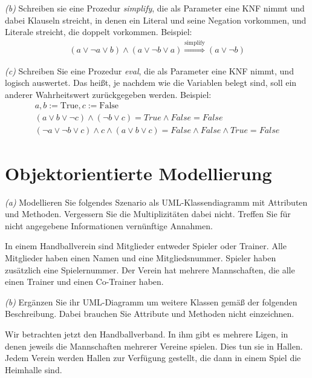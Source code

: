 \documentclass[11pt,a4paper,oneside,ngerman]{scrbook}
\begin{document}
\emph{(b)} Schreiben sie eine Prozedur \emph{simplify}, die als Parameter eine KNF nimmt und dabei Klauseln streicht, in denen ein Literal und seine Negation vorkommen, und Literale streicht, die doppelt vorkommen. Beispiel:
\begin{gather*}
  (a \lor \neg a \lor b) \land (a \lor \neg b \lor a) \overset{\text{simplify}}\Rightarrow (a \lor \neg b)
\end{gather*}

\emph{(c)} Schreiben Sie eine Prozedur \emph{eval}, die als Parameter eine KNF nimmt, und logisch auswertet. Das heißt, je nachdem wie die Variablen belegt sind, soll ein anderer Wahrheitswert zurückgegeben werden. Beispiel:
\begin{gather*}
  a, b := \text{True}, c := \text{False} \\
  (a \lor b \lor \neg c) \land ( \neg b \lor c) = True \land False = False \\
  (\neg a \lor \neg b \lor c ) \land c \land (a \lor b \lor c) = False \land False \land True = False
\end{gather*}




\newpage

\section{Objektorientierte Modellierung}
\emph{(a)} Modellieren Sie folgendes Szenario als UML-Klassendiagramm mit Attributen und Methoden. Vergessern Sie die Multiplizitäten dabei nicht. Treffen Sie für nicht angegebene Informationen vernünftige Annahmen.

In einem Handballverein sind Mitglieder entweder Spieler oder Trainer. Alle Mitglieder haben einen Namen und eine Mitgliedsnummer. Spieler haben zusätzlich eine Spielernummer. Der Verein hat mehrere Mannschaften, die alle einen Trainer und einen Co-Trainer haben.


\newpage

\emph{(b)} Ergänzen Sie ihr UML-Diagramm um weitere Klassen gemäß der folgenden Beschreibung. Dabei brauchen Sie Attribute und Methoden nicht einzeichnen.

Wir betrachten jetzt den Handballverband. In ihm gibt es mehrere Ligen, in denen jeweils die Mannschaften mehrerer Vereine spielen. Dies tun sie in Hallen. Jedem Verein werden Hallen zur Verfügung gestellt, die dann in einem Spiel die Heimhalle sind.


\newpage
\end{document}
